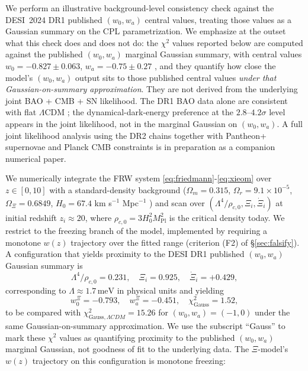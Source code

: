 \documentclass[11pt,reqno]{amsart}
\theoremstyle{plain}
\theoremstyle{definition}
\theoremstyle{remark}
\newcommand{\Pl}{\mathrm{Pl}}
\begin{document}
We perform an illustrative background-level consistency check against
the DESI~2024 DR1 published $(w_0, w_a)$ central values, treating those
values as a Gaussian summary on the CPL parametrization. We emphasize at
the outset what this check does and does not do: the
$\chi^{2}$ values reported below are computed against the published
$(w_0, w_a)$ marginal Gaussian summary, with central values
$w_0 = -0.827 \pm 0.063$, $w_a = -0.75 \pm 0.27$ \cite{DESI2024VI}, and
they quantify how close the model's $(w_0, w_a)$ output sits to those
published central values \emph{under that Gaussian-on-summary
approximation}. They are not derived from the underlying joint
BAO + CMB + SN likelihood. The DR1 BAO data alone are consistent with
flat $\Lambda$CDM \cite{DESI2024BAO}; the dynamical-dark-energy
preference at the $2.8$--$4.2\sigma$ level appears in the joint
likelihood, not in the marginal Gaussian on $(w_0, w_a)$. A full joint
likelihood analysis using the DR2 chains \cite{DESI2025DR2} together
with Pantheon+ supernovae and Planck CMB constraints is in preparation
as a companion numerical paper.

We numerically integrate the FRW system
\eqref{eq:friedmann}-\eqref{eq:xieom} over $z \in [0, 10]$ with a
standard-density background ($\Omega_m = 0.315$, $\Omega_r = 9.1\times10^{-5}$,
$\Omega_\Xi = 0.6849$, $H_0 = 67.4$ km s$^{-1}$ Mpc$^{-1}$
\cite{Planck2020}) and scan over $(\Lambda^{4}/\rho_{c,0}, \Xi_i, \dot\Xi_i)$
at initial redshift $z_i \approx 20$, where $\rho_{c,0} = 3 H_0^{2} M_\Pl^{2}$
is the critical density today. We restrict to the freezing branch of the
model, implemented by requiring a monotone $w(z)$ trajectory over the
fitted range (criterion (F2) of \S\ref{sec:falsify}). A configuration
that yields proximity to the DESI DR1 published $(w_0, w_a)$ Gaussian
summary is
\begin{equation}\label{eq:desibestfit}
  \Lambda^{4}/\rho_{c,0} = 0.231,
  \quad \Xi_i = 0.925,
  \quad \dot\Xi_i = +0.429,
\end{equation}
corresponding to $\Lambda \approx 1.7\,\text{meV}$ in physical units and
yielding
\[
  w_0^{\Xi} = -0.793,\quad
  w_a^{\Xi} = -0.451,\quad
  \chi^{2}_{\text{Gauss}} = 1.52,
\]
to be compared with $\chi^{2}_{\text{Gauss},\Lambda CDM} = 15.26$ for
$(w_0, w_a) = (-1, 0)$ under the same Gaussian-on-summary
approximation. We use the subscript ``Gauss'' to mark these
$\chi^{2}$ values as quantifying proximity to the published
$(w_0, w_a)$ marginal Gaussian, not goodness of fit to the underlying
data. The $\Xi$-model's $w(z)$ trajectory on this configuration is
monotone freezing:
\end{document}
